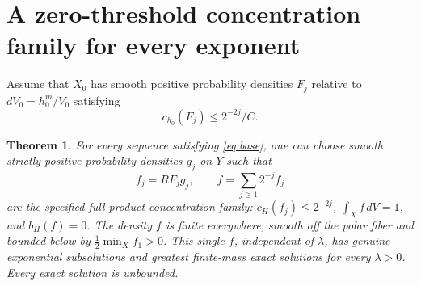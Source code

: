 \documentclass[11pt]{article}
\newtheorem{theorem}{Theorem}
\theoremstyle{remark}\newtheorem{remark}[theorem]{Remark}
\begin{document}
\section{A zero-threshold concentration family for every exponent}
Assume that $X_0$ has smooth positive probability densities $F_j$
relative to $dV_0=h_0^m/V_0$ satisfying
\begin{equation}\label{eq:base}
 c_{h_0}(F_j)\leq 2^{-2j}/C.
\end{equation}
\begin{theorem}\label{th:construction}
For every sequence satisfying \eqref{eq:base}, one can choose smooth
strictly positive probability densities $g_j$ on $Y$ such that
\[
 f_j=RF_jg_j,\qquad f=\sum_{j\geq1}2^{-j}f_j
\]
are the specified full-product concentration family:
$c_H(f_j)\leq2^{-2j}$, $\int_Xf\,dV=1$, and $b_H(f)=0$.
The density $f$ is finite everywhere, smooth off the polar fiber and
bounded below by $\tfrac12\min_Xf_1>0$. This single $f$, independent
of $\lambda$, has genuine exponential subsolutions and greatest
finite-mass exact solutions for every $\lambda>0$. Every exact
solution is unbounded.
\end{theorem}
\end{document}
